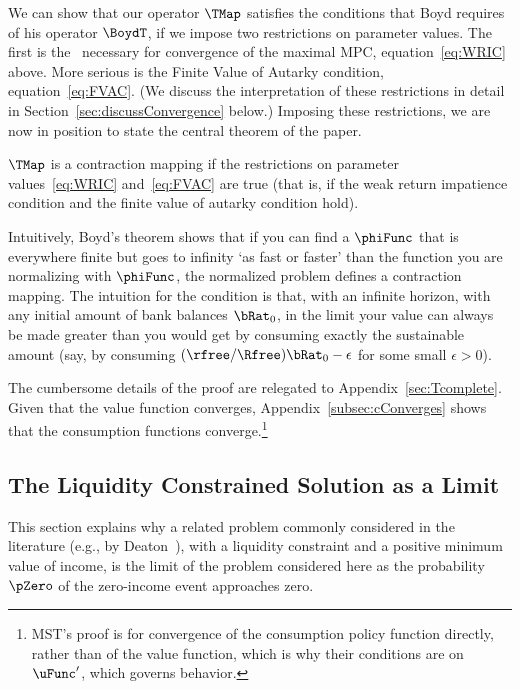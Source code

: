 \documentclass[BufferStockTheory]{subfiles}
\begin{document}
\hypertarget{Contraction-Conditions}{}

We can show that our operator $\TMap$ satisfies the conditions that Boyd requires of his operator $\BoydT$, if we impose two restrictions on parameter values.  The first is the \WRIC~necessary for convergence of the maximal MPC, equation~\eqref{eq:WRIC} above.  More serious is the Finite Value of Autarky condition, equation~\eqref{eq:FVAC}.  (We discuss the interpretation of these restrictions in detail in Section~\ref{sec:discussConvergence} below.)  Imposing these restrictions, we are now in position to state the central theorem of the paper.

\hypertarget{MainTheorem}{}
\setcounter{theorem}{0}
\begin{theorem}\label{thm:contmap}
  $\TMap$ is a contraction mapping if the restrictions on parameter values~\eqref{eq:WRIC} and~\eqref{eq:FVAC} are true (that is, if the weak return impatience condition and the finite value of autarky condition hold).
\end{theorem}

Intuitively, Boyd's theorem shows that if you can find a $\phiFunc$ that is everywhere finite but goes to infinity `as fast or faster' than the function you are normalizing with $\phiFunc$, the normalized problem defines a contraction mapping.  The intuition for the {\FVAC} condition is that, with an infinite horizon, with any initial amount of bank balances $\bRat_{0}$, in the limit your value can always be made greater than you would get by consuming exactly the sustainable amount (say, by consuming $(\rfree/\Rfree)\bRat_{0}-\epsilon$ for some small $\epsilon>0$).

The cumbersome details of the proof are relegated to Appendix~\ref{sec:Tcomplete}.  Given that the value function converges, Appendix~\ref{subsec:cConverges} shows that the consumption functions converge.\footnote{MST's proof is for convergence of the consumption policy function directly, rather than of the value function, which is why their conditions are on $\uFunc^{\prime}$, which governs behavior.}

\hypertarget{The-Liquidity-Constrained-Solution-as-a-Limit}{}
\subsection{The Liquidity Constrained Solution as a Limit}\label{sec:deatonIsLimit}

This section explains why a related problem commonly considered in the literature (e.g., by Deaton~\citeyearpar{deatonLiqConstr}), with a liquidity constraint and a positive minimum value of income, is the limit of the problem considered here as the probability $\pZero$ of the zero-income event approaches zero.
\end{document}
